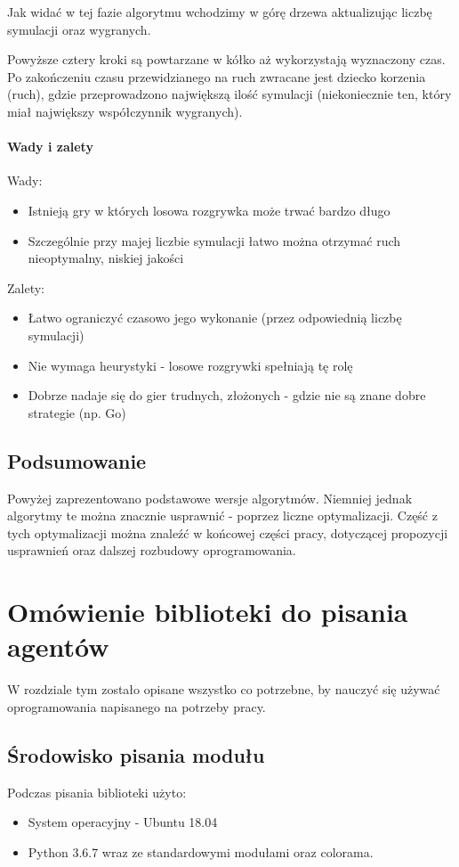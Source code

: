 \documentclass[polish,shortabstract,inz]{iithesis}
\begin{document}


Jak widać w tej fazie algorytmu wchodzimy w górę drzewa aktualizując liczbę symulacji oraz wygranych.

Powyższe cztery kroki są powtarzane w kółko aż wykorzystają wyznaczony czas.
Po zakończeniu czasu przewidzianego na ruch zwracane jest dziecko korzenia (ruch), gdzie przeprowadzono największą ilość symulacji (niekoniecznie ten, który miał największy współczynnik wygranych).

\subsubsection{Wady i zalety}
Wady:
\begin{itemize}
  \item Istnieją gry w których losowa rozgrywka może trwać bardzo długo
  \item Szczególnie przy majej liczbie symulacji łatwo można otrzymać ruch nieoptymalny, niskiej jakości
\end{itemize}
Zalety:
\begin{itemize}
  \item Łatwo ograniczyć czasowo jego wykonanie (przez odpowiednią liczbę symulacji)
  \item Nie wymaga heurystyki - losowe rozgrywki spełniają tę rolę
  \item Dobrze nadaje się do gier trudnych, złożonych - gdzie nie są znane dobre strategie (np. Go)
\end{itemize}

\section{Podsumowanie}
Powyżej zaprezentowano podstawowe wersje algorytmów.
Niemniej jednak algorytmy te można znacznie usprawnić - poprzez liczne optymalizacji.
Część z tych optymalizacji można znaleźć w końcowej części pracy, dotyczącej propozycji usprawnień oraz dalszej rozbudowy oprogramowania.


\chapter{Omówienie biblioteki do pisania agentów}
W rozdziale tym zostało opisane wszystko co potrzebne, by nauczyć się używać oprogramowania napisanego na potrzeby pracy.
\section{Środowisko pisania modułu}
Podczas pisania biblioteki użyto:
\begin{itemize}
  \item System operacyjny - Ubuntu 18.04
  \item Python 3.6.7 wraz ze standardowymi modułami oraz colorama.
\end{itemize}
\end{document}
